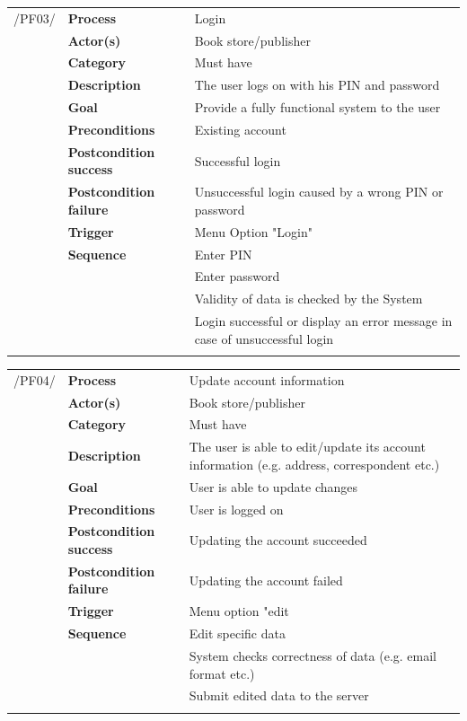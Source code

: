 \documentclass[11pt,a4paper,oneside,svgnames]{report}
\begin{document}
\noindent
\begin{tabular}{p{1.5cm}p{3cm}p{8cm}}
\cellcolor{white}/PF03/	& \textbf{Process} & Login\\
\cellcolor{white}		& \textbf{Actor(s)} & Book store/publisher\\
\cellcolor{white}		& \textbf{Category} & Must have\\
\cellcolor{white}		& \textbf{Description}	 & The user logs on with his PIN and password\\
\cellcolor{white}		& \textbf{Goal} & Provide a fully functional system to the user\\
\cellcolor{white}		& \textbf{Preconditions} & Existing account\\
\cellcolor{white}		& \textbf{Postcondition success} & Successful login\\
\cellcolor{white}		& \textbf{Postcondition failure} & Unsuccessful login caused by a wrong PIN or password\\
\cellcolor{white}		& \textbf{Trigger} & Menu Option "Login"\\
\cellcolor{white}		& \textbf{Sequence} & Enter PIN\\
\cellcolor{white}		& & Enter password\\
\cellcolor{white}		& & Validity of data is checked by the System\\
\cellcolor{white}		& & Login successful or display an error message in case of unsuccessful login\\
\cellcolor{white}\hfill \\
\end{tabular}

\noindent
\begin{tabular}{p{1.5cm}p{3cm}p{8cm}}
\cellcolor{white}/PF04/	& \textbf{Process} & Update account information\\
\cellcolor{white}		& \textbf{Actor(s)} & Book store/publisher\\
\cellcolor{white}		& \textbf{Category} & Must have\\
\cellcolor{white}		& \textbf{Description}	 & The user is able to edit/update its account information (e.g. address, correspondent etc.)\\
\cellcolor{white}		& \textbf{Goal} & User is able to update changes\\
\cellcolor{white}		& \textbf{Preconditions} & User is logged on\\
\cellcolor{white}		& \textbf{Postcondition success} & Updating the account succeeded\\
\cellcolor{white}		& \textbf{Postcondition failure} & Updating the account failed\\
\cellcolor{white}		& \textbf{Trigger} & Menu option "edit\\
\cellcolor{white}		& \textbf{Sequence} & Edit specific data\\
\cellcolor{white}		& & System checks correctness of data (e.g. email format etc.)\\
\cellcolor{white}		& & Submit edited data to the server\\
\cellcolor{white}\hfill \\
\end{tabular}
\end{document}

